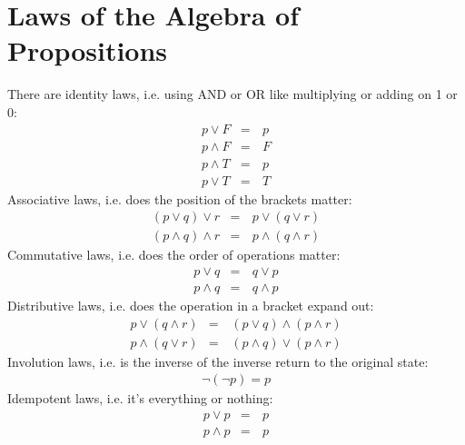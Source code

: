 \documentclass[letterpaper,10pt,english]{jupyterBook}
\begin{document}
\section{Laws of the Algebra of Propositions}
\label{\detokenize{ProofLogic/propositionallogic:laws-of-the-algebra-of-propositions}}
\sphinxAtStartPar
There are identity laws, i.e. using AND or OR like multiplying or adding on 1 or 0:
\begin{equation*}
\begin{split}p \vee F &=&\, p \\
p \wedge F &=&\, F \\
p \wedge T &=&\, p \\
p \vee T &=&\, T\end{split}
\end{equation*}
\sphinxAtStartPar
Associative laws, i.e. does the position of the brackets matter:
\begin{equation*}
\begin{split}(p \vee q) \vee r &=&\,  p \vee (q \vee r)\\
(p \wedge q) \wedge r &=&\,  p \wedge (q \wedge r)\end{split}
\end{equation*}
\sphinxAtStartPar
Commutative laws, i.e. does the order of operations matter:
\begin{equation*}
\begin{split}p \vee q &=&\, q \vee p \\
p \wedge q &=&\, q \wedge p\end{split}
\end{equation*}
\sphinxAtStartPar
Distributive laws, i.e. does the operation in a bracket expand out:
\begin{equation*}
\begin{split}p \vee (q \wedge r) &=&\, (p\vee q) \wedge (p \wedge r)\\
p \wedge (q \vee r) &=&\, (p\wedge q) \vee (p \wedge r)\end{split}
\end{equation*}
\sphinxAtStartPar
Involution laws, i.e. is the inverse of the inverse return to the original state:
\begin{equation*}
\begin{split}\neg(\neg p) = p\end{split}
\end{equation*}
\sphinxAtStartPar
Idempotent laws, i.e. it’s everything or nothing:
\begin{equation*}
\begin{split}p \vee p &=&\, p \\
p \wedge p &=&\, p\end{split}
\end{equation*}
\end{document}
